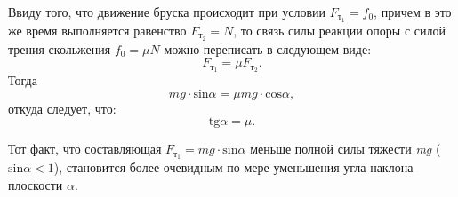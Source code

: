 \documentclass[14pt,a4paper,oneside]{extarticle}	%
\begin{document}
Ввиду того, что движение бруска происходит при условии $  F_{\text{т}_1}=f_0 $, причем в это же время выполняется равенство $ F_{\text{т}_2}=N $, то связь силы реакции опоры с силой трения скольжения $ f_0 = \mu N $ можно переписать в следующем виде:
	\begin{equation}\label{friction-4eq4}
F_{\text{т}_1} = \mu F_{\text{т}_2}.
\end{equation}
Тогда
 	\begin{equation}\label{friction-4eq5}
  mg \cdot \text{sin}\alpha = \mu mg \cdot \text{cos}\alpha,
 \end{equation}
откуда следует, что:
 	\begin{equation}\label{friction-4eq6}
\text{tg}\alpha = \mu.
\end{equation}

Тот факт, что составляющая $ F_{\text{т}_1} = mg \cdot\text{sin}\alpha $ меньше полной силы тяжести \textit{mg} ($\text{sin}\alpha < 1$), становится более очевидным по мере уменьшения угла наклона плоскости $ \alpha $.
\end{document}
